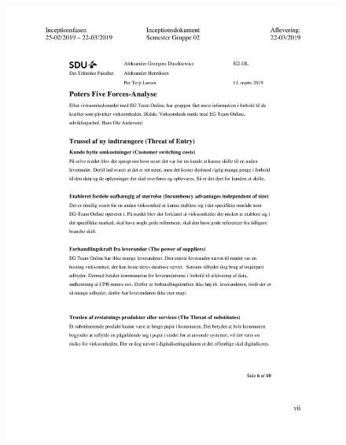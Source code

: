 \begin{figure}[hb]
  \includegraphics[scale = 0.33]{./PNG/Inceptions/Gruppe02+InceptionsDokument-40.jpg} 
\end{figure}

